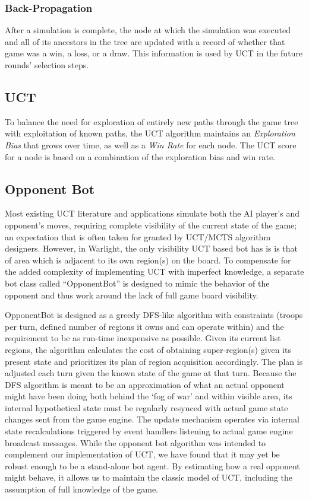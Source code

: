 \documentclass[a4paper,11pt]{article}
\begin{document}
\subsubsection{Back-Propagation}
After a simulation is complete, the node at which the simulation was executed and all of its 
ancestors in the tree are updated with a record of whether that game was a win, a loss, or a 
draw.  This information is used by UCT in the future rounds' selection steps.

\subsection{UCT}\label{sec:uct}
To balance the need for exploration of entirely new paths through the game tree with
exploitation of known paths, the UCT algorithm maintains an \emph{Exploration Bias} that grows
over time, as well as a \emph{Win Rate} for each node.  The UCT score for a node is based on a
combination of the exploration bias and win rate.

\subsection{Opponent Bot}\label{sec:oppbot}
Most existing UCT literature and applications simulate both the AI player's and opponent's
moves, requiring complete visibility of the current state of the game; an expectation that
is often taken for granted by UCT/MCTS algorithm designers. However, in Warlight, the only
visibility UCT based bot has is is that of area which is adjacent to its own region(s) on 
the board. To compensate for the added complexity of implementing UCT with imperfect 
knowledge, a separate bot class called ``OpponentBot'' is designed to mimic the behavior of 
the opponent and thus work around the lack of full game board visibility.

OpponentBot is designed as a greedy DFS-like algorithm with constraints (troops per turn,
defined number of regions it owns and can operate within) and the requirement to be as
run-time inexpensive as possible. Given its current list regions, the algorithm calculates
the cost of obtaining super-region(s) given its present state and prioritizes its plan of
region acquisition accordingly. The plan is adjusted each turn given the known state of the 
game at that turn. Because the DFS algorithm is meant to be an approximation of what an
actual opponent might have been doing both behind the `fog of war' and within visible area, 
its internal hypothetical state must be regularly resynced with actual game state changes
sent from the game engine.  The update mechanism operates via internal state recalculations 
triggered by event handlers listening to actual game engine broadcast messages. While the
opponent bot algorithm was intended to complement our implementation of UCT, we have found 
that it may yet be robust enough to be a stand-alone bot agent. By estimating how a real 
opponent might behave, it allows us to maintain the classic model of UCT, including the 
assumption of full knowledge of the game.
\end{document}
